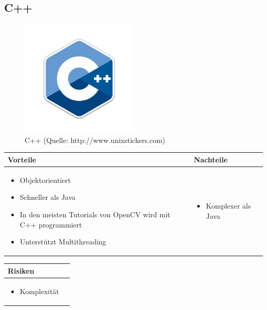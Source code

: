 \pagebreak


\subsection{C++}
\begin{figure}[h!]%
\centering
\includegraphics[width=0.5\textwidth]{fig/cplusplus.png}
\caption{C++ (Quelle: http://www.unixstickers.com)}
\label{fig:C++}
\end{figure}
\begin{table}[h]
\begin{tabular}{p{} | p{}}


 \textbf{Vorteile} & \textbf{Nachteile} \\ \hline
	 
\begin{itemize}
\item Objektorientiert
\item Schneller als Java
\item In den meisten Tutorials von OpenCV wird mit C++ programmiert
\item Unterstützt Multithreading
\end{itemize}

 
 &
 
\begin{itemize}
\item Komplexer als Java
\end{itemize}

\end{tabular}
\end{table}

\begin{table}[h]
\begin{tabular}{p{}p{}}


 \textbf{Risiken} & \\ \hline
	 
\begin{itemize}
\item Komplexität
\end{itemize}

 
\end{tabular}
\end{table}

\pagebreak